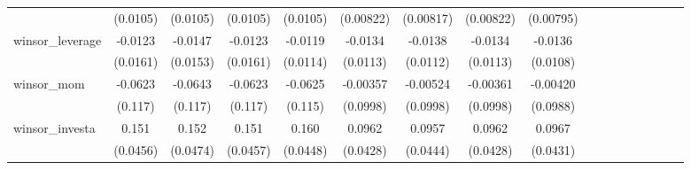 \begin{table}[htbp]
\begin{tabular}{l*{16}{c}}
                    &    (0.0105)         &    (0.0105)         &    (0.0105)         &    (0.0105)         &   (0.00822)         &   (0.00817)         &   (0.00822)         &   (0.00795)         &                     &                     &                     &                     &                     &                     &                     &                     \\
[1em]
winsor\_leverage     &     -0.0123         &     -0.0147         &     -0.0123         &     -0.0119         &     -0.0134         &     -0.0138         &     -0.0134         &     -0.0136         &                     &                     &                     &                     &                     &                     &                     &                     \\
                    &    (0.0161)         &    (0.0153)         &    (0.0161)         &    (0.0114)         &    (0.0113)         &    (0.0112)         &    (0.0113)         &    (0.0108)         &                     &                     &                     &                     &                     &                     &                     &                     \\
[1em]
winsor\_mom          &     -0.0623         &     -0.0643         &     -0.0623         &     -0.0625         &    -0.00357         &    -0.00524         &    -0.00361         &    -0.00420         &                     &                     &                     &                     &                     &                     &                     &                     \\
                    &     (0.117)         &     (0.117)         &     (0.117)         &     (0.115)         &    (0.0998)         &    (0.0998)         &    (0.0998)         &    (0.0988)         &                     &                     &                     &                     &                     &                     &                     &                     \\
[1em]
winsor\_investa      &       0.151\sym{***}&       0.152\sym{***}&       0.151\sym{***}&       0.160\sym{***}&      0.0962\sym{**} &      0.0957\sym{**} &      0.0962\sym{**} &      0.0967\sym{**} &                     &                     &                     &                     &                     &                     &                     &                     \\
                    &    (0.0456)         &    (0.0474)         &    (0.0457)         &    (0.0448)         &    (0.0428)         &    (0.0444)         &    (0.0428)         &    (0.0431)         &                     &                     &                     &                     &                     &                     &                     &                     \\

\end{tabular}
\end{table}
